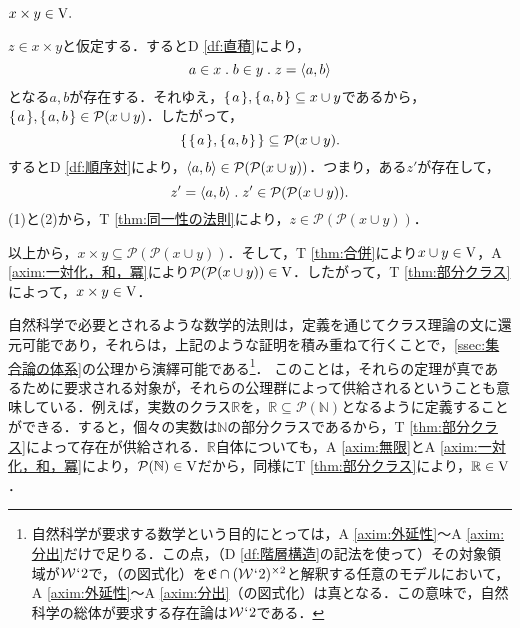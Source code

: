 \begin{thm}[直積]
\label{thm:直積}
$
    x\times y\in\mathrm{V}.
$
\end{thm}
\setcounter{equation}{0}
\begin{pf}
    $ z\in x\times y $と仮定する．するとD \ref{df:直積}により，
    \begin{equation}
        a\in x\con{1}b\in y\con{1}z = \orp{a,b}
    \end{equation}
    となる$a,b$が存在する．それゆえ，$ \{\mspace{2mu}a\mspace{2mu}\},\{\mspace{2mu}a,b\mspace{2mu}\}\subseteq x\cup y $であるから，$ \{\mspace{2mu}a\mspace{2mu}\},\{\mspace{2mu}a,b\mspace{2mu}\}\in\mathcal{P}(x\cup y)$．したがって，
    \[
        \{\mspace{2mu}\{\mspace{2mu}a\mspace{2mu}\},\{\mspace{2mu}a,b\mspace{2mu}\}\mspace{2mu}\}\subseteq\mathcal{P}(x\cup y).
    \]
    するとD \ref{df:順序対}により，$ \langle a,b \rangle\in\mathcal{P}(\mathcal{P}(x\cup y)) $．つまり，ある$ z' $が存在して，
    \begin{equation}
        z'=\orp{a,b}\con{1}z'\in \mathcal{P}(\mathcal{P}(x\cup y)).
    \end{equation}
    (1)と(2)から，T \ref{thm:同一性の法則}により，$ z\in\mathcal{P}(\mathcal{P}(x\cup y)) $．

    以上から，$ x\times y\subseteq \mathcal{P}(\mathcal{P}(x\cup y)) $．そして，T \ref{thm:合併}により$x\cup y\in\mathrm{V}$，A \ref{axim:一対化，和，冪}により$\mathcal{P}(\mathcal{P}(x\cup y))\in\mathrm{V}$．したがって，T \ref{thm:部分クラス}によって，$x\times y\in\mathrm{V}$．
\end{pf}

自然科学で必要とされるような数学的法則は，定義を通じてクラス理論の文に還元可能であり，それらは，上記のような証明を積み重ねて行くことで，\ref{ssec:集合論の体系}の公理から演繹可能である\footnote{
    自然科学が要求する数学という目的にとっては，A \ref{axim:外延性}〜A \ref{axim:分出}だけで足りる．この点，（D \ref{df:階層構造}の記法を使って）その対象領域が$\mathcal{W}{\mspace{1mu}{`}\mspace{1mu}} 2$で，\kagi{$ \in $}（の図式化）を$ \mathfrak{E}\cap(\mathcal{W}{\mspace{1mu}{`}\mspace{1mu}} 2)^{\times 2} $と解釈する任意のモデルにおいて，A \ref{axim:外延性}〜A \ref{axim:分出}（の図式化）は真となる．この意味で，自然科学の総体が要求する存在論は$ \mathcal{W}{\mspace{1mu}{`}\mspace{1mu}} 2 $である．
}．
このことは，それらの定理が真であるために要求される対象が，それらの公理群によって供給されるということも意味している．例えば，実数のクラス$\mathbb{R}$を，$ \mathbb{R}\subseteq\mathcal{P}(\mathbb{N}) $となるように定義することができる．すると，個々の実数は$\mathbb{N}$の部分クラスであるから，T \ref{thm:部分クラス}によって存在が供給される．$\mathbb{R}$自体についても，A \ref{axim:無限}とA \ref{axim:一対化，和，冪}により，$ \mathcal{P}(\mathbb{N})\in\mathrm{V} $だから，同様にT \ref{thm:部分クラス}により，$ \mathbb{R}\in\mathrm{V} $．

